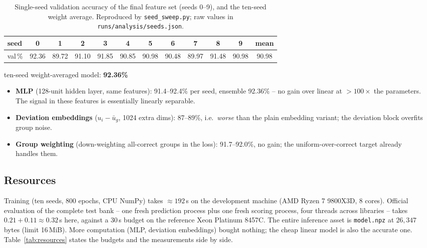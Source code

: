 \documentclass[10pt,a4paper]{article}
\begin{document}
\begin{table}[t]
\centering\small
\caption{Single-seed validation accuracy of the final feature set (seeds 0--9),
and the ten-seed weight average. Reproduced by \texttt{seed\_sweep.py};
raw values in \texttt{runs/analysis/seeds.json}.}
\label{tab:seeds}
\begin{tabular}{lcccccccccc|c}
\hline
seed & 0 & 1 & 2 & 3 & 4 & 5 & 6 & 7 & 8 & 9 & mean \\
\hline
val\,\% & 92.36 & 89.72 & 91.10 & 91.85 & 90.85 & 90.98 & 90.48 & 89.97 & 91.48 & 90.98 & 90.98 \\
\hline
\end{tabular}

\vspace{0.5em}
ten-seed weight-averaged model: \textbf{92.36\%}
\end{table}
\begin{itemize}\itemsep0pt
\item \textbf{MLP} (128-unit hidden layer, same features): 91.4--92.4\% per
seed, ensemble 92.36\% -- no gain over linear at $>100\times$ the parameters.
The signal in these features is essentially linearly separable.
\item \textbf{Deviation embeddings} ($u_i - \bar u_g$, 1024 extra dims):
87--89\%, i.e.\ \emph{worse} than the plain embedding variant; the deviation
block overfits group noise.
\item \textbf{Group weighting} (down-weighting all-correct groups in the loss):
91.7--92.0\%, no gain; the uniform-over-correct target already handles them.
\end{itemize}

\subsection{Resources}
Training (ten seeds, 800 epochs, CPU NumPy) takes $\approx192$\,s on the
development machine (AMD Ryzen 7 9800X3D, 8 cores). Official evaluation of the
complete test bank -- one fresh prediction process plus one fresh scoring
process, four threads across libraries -- takes $0.21 + 0.11 \approx 0.32$\,s
here, against a 30\,s budget on the reference Xeon Platinum 8457C. The entire
inference asset is \texttt{model.npz} at $26{,}347$ bytes (limit 16\,MiB).
More computation (MLP, deviation embeddings) bought nothing; the cheap linear
model is also the accurate one. Table~\ref{tab:resources} states the budgets
and the measurements side by side.
\end{document}
